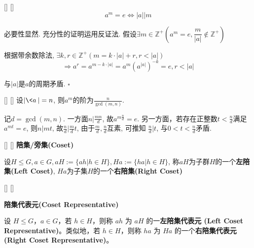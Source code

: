 \documentclass[UTF8]{ctexart}
\begin{document}
		\begin{ppt}
            []
            {}
            []
            []
			\[a^{m}=e\iff|a|{\Big|}m\]
		\end{ppt}	
		
		\begin{prf}
			必要性显然. 充分性的证明运用反证法. 假设$\exists m\in\mathbb{Z}^{+}(a^{m}=e, \dfrac{m}{|a|}\notin\mathbb{Z}^{+})$
			
			根据带余数除法, $\exists k,r\in\mathbb{Z}^{+}(m=k\cdot |a|+r, r<|a|)$
			\[\Longrightarrow a^{r}=a^{m-k\cdot |a|}=a^{m}(a^{|a|})^{-k}=e, r<|a|\]
			
			与$|a|$是$a$的周期矛盾. $\square$ 
	\end{prf}

        \begin{ppt}
            []
            {}
            []
            []
            设$|\<a\>|=n$, 则$a^m$的阶为$\frac{n}{\gcd(m,n)}$. 
       \end{ppt}

        \begin{prf}
            记$d=\gcd(m,n)$. 一方面$n|\frac{mn}{d}$, 故$a^{m\frac{n}{d}}=e$. 另一方面，若存在正整数$t<\frac{n}{d}$满足$a^{mt}=e$, 则$n|mt$, 故$\frac{n}{d}\Big|\frac{m}{d}t$, 
            由于$\frac{m}{d},\frac{n}{d}$互素, 可推知
            $\frac{n}{d}\Big|t$, 与$0<t<\frac{n}{d}$矛盾.
        \end{prf}
        
		\begin{dfn}
            []
            {}
            []
            []
			\textbf{陪集/旁集(Coset)}

			设$H\leq G, a\in G, aH:=\{ah|h\in H\}, Ha:=\{ha|h\in H\}$, 称$aH$为子群$H$的一个\textbf{左陪集(Left Coset)}, $Ha$为子集$H$的一个\textbf{右陪集(Right Coset)}

                  
		\end{dfn}

            \begin{dfn}
            []
            {}
            []
            []

            \textbf{陪集代表元(Coset Representative)}

                设 \(H \leq G\)，\(a \in G\)，若 \(h \in H\)，则称 \(ah\) 为 \(aH\) 的一\textbf{左陪集代表元 (Left Coset Representative)}。类似地，若 \(h \in H\)，则称 \(ha\) 为 \(Ha\) 的一个\textbf{右陪集代表元 (Right Coset Representative)}。
           \end{dfn}
\end{document}
